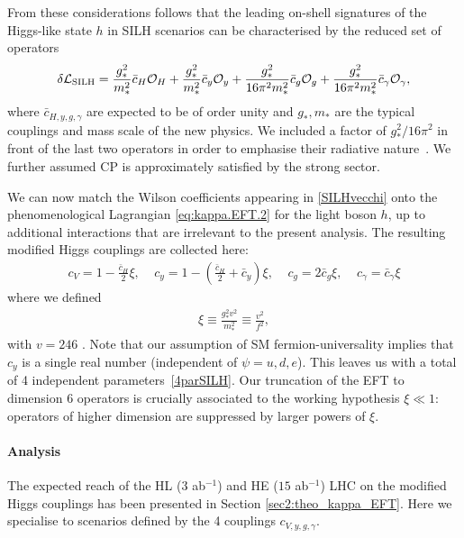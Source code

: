 From these considerations follows that the leading on-shell signatures of the Higgs-like state $h$ in SILH scenarios can be characterised by the reduced set of operators 
\begin{eqnarray}\label{SILHvecchi}
\delta{\cal L}_{\rm SILH}=\frac{g_*^2}{m_*^2}\bar c_H{\cal O}_H+\frac{g_*^2}{m_*^2} \bar c_y{\cal O}_y+\frac{g_*^2}{16\pi^2m_*^2}\bar c_g{\cal O}_g+\frac{g_*^2}{16\pi^2m_*^2}\bar c_\gamma{\cal O}_\gamma,
\end{eqnarray}
where $\bar c_{H,y,g,\gamma}$ are expected to be of order unity and $g_*, m_*$ are the typical couplings and mass scale of the new physics. We included a factor of ${g_*^2}/{16\pi^2}$ in front of the last two operators in order to emphasise their radiative nature~\cite{Giudice:2007fh}. We further assumed CP is approximately satisfied by the strong sector.

We can now match the Wilson coefficients appearing in \eqref{SILHvecchi} onto the phenomenological Lagrangian \eqref{eq:kappa.EFT.2} for the light boson $h$, up to additional interactions that are irrelevant to the present analysis. The resulting modified Higgs couplings are collected here:
\begin{eqnarray}\label{4parSILH}
c_V=1-\frac{\bar c_H}{2}\xi,~~~~~c_y=1-\left(\frac{\bar c_H}{2}+\bar c_y\right)\xi,~~~~~c_g=2 \bar c_g\xi,~~~~~c_\gamma=\bar c_\gamma\xi
\end{eqnarray}
where we defined 
\begin{eqnarray}\label{xi}
\xi\equiv\frac{g_*^2v^2}{m_*^2}\equiv\frac{v^2}{f^2},
\end{eqnarray}
with $v=246$ \UGeV. Note that our assumption of SM fermion-universality implies that $c_y$ is a single real number (independent of $\psi=u,d,e$). This leaves us with a total of 4 independent parameters~\eqref{4parSILH}. Our truncation of the EFT to dimension 6 operators is crucially associated to the working hypothesis $\xi\ll1$: operators of higher dimension are suppressed by larger powers of $\xi$. 





\paragraph{Analysis}

The expected reach of the HL ($3$ ab$^{-1}$) and HE ($15$ ab$^{-1}$) LHC on the modified Higgs couplings has been presented in Section \ref{sec2:theo_kappa_EFT}. Here we specialise to scenarios defined by the 4 couplings $c_{V,y,g,\gamma}$. 


